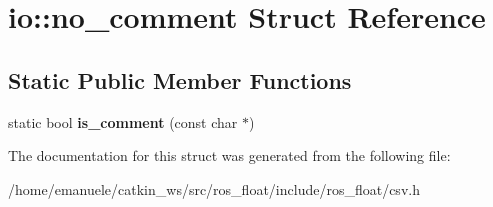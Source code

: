 \hypertarget{structio_1_1no__comment}{}\section{io\+:\+:no\+\_\+comment Struct Reference}
\label{structio_1_1no__comment}
\subsection*{Static Public Member Functions}
\begin{DoxyCompactItemize}
\item 
\mbox{\label{structio_1_1no__comment_a52b252547482e28edd076ee2224bc8d8}} 
static bool {\bfseries is\+\_\+comment} (const char $\ast$)
\end{DoxyCompactItemize}


The documentation for this struct was generated from the following file\+:\begin{DoxyCompactItemize}
\item 
/home/emanuele/catkin\+\_\+ws/src/ros\+\_\+float/include/ros\+\_\+float/csv.\+h\end{DoxyCompactItemize}
